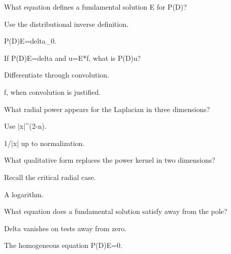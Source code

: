 \begin{exercise}[Definition]\label{exr:iii24-expand-01}
What equation defines a fundamental solution E for P(D)?
\end{exercise}
\begin{hint}
Use the distributional inverse definition.
\end{hint}
\begin{solution}
P(D)E=delta\_0.
\end{solution}

\begin{exercise}[Convolution]\label{exr:iii24-expand-02}
If P(D)E=delta and u=E*f, what is P(D)u?
\end{exercise}
\begin{hint}
Differentiate through convolution.
\end{hint}
\begin{solution}
f, when convolution is justified.
\end{solution}

\begin{exercise}[Dimension 3]\label{exr:iii24-expand-03}
What radial power appears for the Laplacian in three dimensions?
\end{exercise}
\begin{hint}
Use |x|\textasciicircum{}(2-n).
\end{hint}
\begin{solution}
1/|x| up to normalization.
\end{solution}

\begin{exercise}[Dimension 2]\label{exr:iii24-expand-04}
What qualitative form replaces the power kernel in two dimensions?
\end{exercise}
\begin{hint}
Recall the critical radial case.
\end{hint}
\begin{solution}
A logarithm.
\end{solution}

\begin{exercise}\label{exr:iii24-expand-05}
What equation does a fundamental solution satisfy away from the pole?
\end{exercise}
\begin{hint}
Delta vanishes on tests away from zero.
\end{hint}
\begin{solution}
The homogeneous equation P(D)E=0.
\end{solution}

